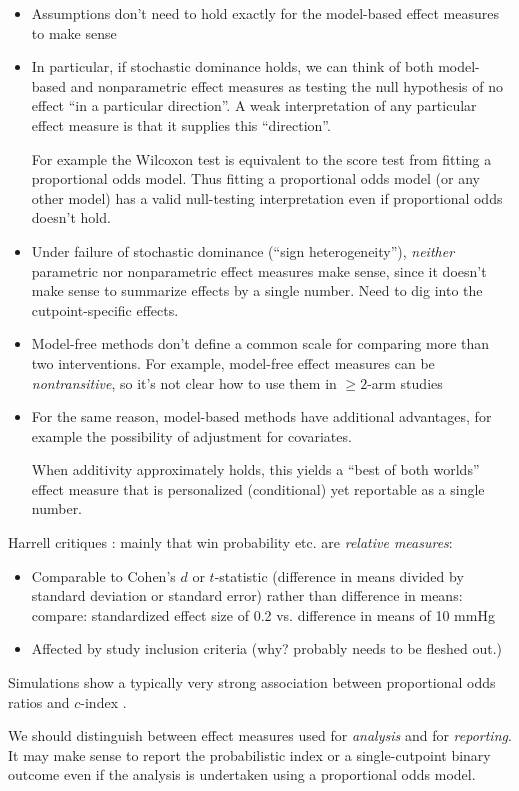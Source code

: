 \documentclass[
  11pt,
  fleqn
]{article}
\begin{document}
\begin{itemize}
  \item Assumptions don't need to hold exactly for the model-based
    effect measures to make sense
  \item In particular, if stochastic dominance holds, we can think of
    both model-based and nonparametric effect measures as
    testing the null hypothesis of no effect ``in a particular
    direction''. A weak interpretation of any particular
    effect measure
    is that it supplies this ``direction''.

    For example the Wilcoxon test is
    equivalent to the score test from fitting a proportional odds model.
    Thus fitting a proportional odds model (or any other model) has a
    valid null-testing
    interpretation even if proportional odds doesn't hold.
  \item Under failure of stochastic dominance (``sign
    heterogeneity''), \emph{neither} parametric nor nonparametric
    effect measures make sense, since it doesn't make sense to
    summarize effects by a single number. Need to dig into the
    cutpoint-specific effects.
  \item Model-free methods don't define a common scale for comparing
    more than two interventions. For example, model-free effect
    measures can be \emph{nontransitive}, so it's not clear how to
    use them in $\geq 2$-arm studies
  \item For the same reason, model-based methods have additional
    advantages, for example
    the possibility of adjustment for covariates.

    When additivity approximately holds, this yields a ``best of both
    worlds'' effect measure that is
    personalized (conditional) yet reportable as a single
    number.
\end{itemize}

Harrell critiques \citep{harrellOverviewCompositeOutcome2024,
harrellRareDegenerativeDiseases2024, harrellViewsCompositeOutcome}:
mainly that
win probability etc. are \emph{relative measures}:

\begin{itemize}
  \item Comparable to Cohen's $d$ or $t$-statistic (difference in
    means divided by standard deviation or standard error) rather than
    difference in means: compare: standardized effect size of 0.2 vs.
    difference in means of 10 mmHg
  \item Affected by study inclusion criteria (why? probably needs to
    be fleshed out.)
\end{itemize}

Simulations show a typically very strong association between
proportional odds ratios and $c$-index
\citep{harrellViolationProportionalOdds2020}.

We should distinguish between effect measures used for \emph{analysis} and for
\emph{reporting}. It may make sense to report the probabilistic index or a
single-cutpoint binary outcome even if the analysis is undertaken using a
proportional odds model.

\newpage

\printbibliography
\end{document}
